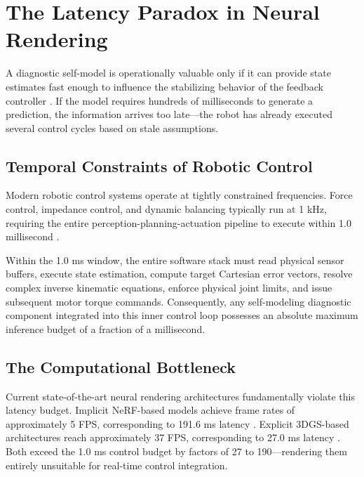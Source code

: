 \documentclass[12pt,a4paper,oneside]{report}
\begin{document}
\section{The Latency Paradox in Neural Rendering}
\label{sec:latency_paradox}

A diagnostic self-model is operationally valuable only if it can provide state estimates fast enough to influence the stabilizing behavior of the feedback controller \cite{hu2024teaching, hu2025learning}. If the model requires hundreds of milliseconds to generate a prediction, the information arrives too late---the robot has already executed several control cycles based on stale assumptions.

\subsection{Temporal Constraints of Robotic Control}
\label{subsec:temporal_constraints}

Modern robotic control systems operate at tightly constrained frequencies. Force control, impedance control, and dynamic balancing typically run at 1 kHz, requiring the entire perception-planning-actuation pipeline to execute within 1.0 millisecond \cite{siciliano2009robotics}. 

Within the 1.0 ms window, the entire software stack must read physical sensor buffers, execute state estimation, compute target Cartesian error vectors, resolve complex inverse kinematic equations, enforce physical joint limits, and issue subsequent motor torque commands. Consequently, any self-modeling diagnostic component integrated into this inner control loop possesses an absolute maximum inference budget of a fraction of a millisecond.

\subsection{The Computational Bottleneck}
\label{subsec:computational_bottleneck}

Current state-of-the-art neural rendering architectures fundamentally violate this latency budget. Implicit NeRF-based models achieve frame rates of approximately 5 FPS, corresponding to 191.6 ms latency \cite{hu2024teaching}. Explicit 3DGS-based architectures reach approximately 37 FPS, corresponding to 27.0 ms latency \cite{hu2025learning}. Both exceed the 1.0 ms control budget by factors of 27 to 190---rendering them entirely unsuitable for real-time control integration.
\end{document}
